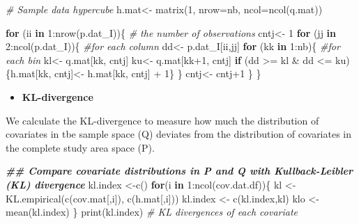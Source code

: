 \documentclass[
]{book}
\newenvironment{Shaded}{\begin{snugshade}}{\end{snugshade}}
\newcommand{\AttributeTok}[1]{\textcolor[rgb]{0.77,0.63,0.00}{#1}}
\newcommand{\CommentTok}[1]{\textcolor[rgb]{0.56,0.35,0.01}{\textit{#1}}}
\newcommand{\ControlFlowTok}[1]{\textcolor[rgb]{0.13,0.29,0.53}{\textbf{#1}}}
\newcommand{\DecValTok}[1]{\textcolor[rgb]{0.00,0.00,0.81}{#1}}
\newcommand{\DocumentationTok}[1]{\textcolor[rgb]{0.56,0.35,0.01}{\textbf{\textit{#1}}}}
\newcommand{\FunctionTok}[1]{\textcolor[rgb]{0.00,0.00,0.00}{#1}}
\newcommand{\NormalTok}[1]{#1}
\newcommand{\OtherTok}[1]{\textcolor[rgb]{0.56,0.35,0.01}{#1}}
\newcommand{\SpecialCharTok}[1]{\textcolor[rgb]{0.00,0.00,0.00}{#1}}
\providecommand{\tightlist}{%
  \setlength{\itemsep}{0pt}\setlength{\parskip}{0pt}}
\begin{document}
\begin{Shaded}
\begin{Highlighting}[]
\CommentTok{\# Sample data hypercube}
\NormalTok{  h.mat}\OtherTok{\textless{}{-}} \FunctionTok{matrix}\NormalTok{(}\DecValTok{1}\NormalTok{, }\AttributeTok{nrow=}\NormalTok{nb, }\AttributeTok{ncol=}\FunctionTok{ncol}\NormalTok{(q.mat))}
  
  \ControlFlowTok{for}\NormalTok{ (ii }\ControlFlowTok{in} \DecValTok{1}\SpecialCharTok{:}\FunctionTok{nrow}\NormalTok{(p.dat\_I))\{ }\CommentTok{\# the number of observations}
\NormalTok{    cntj}\OtherTok{\textless{}{-}} \DecValTok{1} 
    \ControlFlowTok{for}\NormalTok{ (jj }\ControlFlowTok{in} \DecValTok{2}\SpecialCharTok{:}\FunctionTok{ncol}\NormalTok{(p.dat\_I))\{ }\CommentTok{\#for each column}
\NormalTok{      dd}\OtherTok{\textless{}{-}}\NormalTok{ p.dat\_I[ii,jj]  }
      \ControlFlowTok{for}\NormalTok{ (kk }\ControlFlowTok{in} \DecValTok{1}\SpecialCharTok{:}\NormalTok{nb)\{  }\CommentTok{\#for each bin}
\NormalTok{        kl}\OtherTok{\textless{}{-}}\NormalTok{ q.mat[kk, cntj] }
\NormalTok{        ku}\OtherTok{\textless{}{-}}\NormalTok{ q.mat[kk}\SpecialCharTok{+}\DecValTok{1}\NormalTok{, cntj] }
        \ControlFlowTok{if}\NormalTok{ (dd }\SpecialCharTok{\textgreater{}=}\NormalTok{ kl }\SpecialCharTok{\&}\NormalTok{ dd }\SpecialCharTok{\textless{}=}\NormalTok{ ku)\{h.mat[kk, cntj]}\OtherTok{\textless{}{-}}\NormalTok{ h.mat[kk, cntj] }\SpecialCharTok{+} \DecValTok{1}\NormalTok{\}}
\NormalTok{      \}}
\NormalTok{      cntj}\OtherTok{\textless{}{-}}\NormalTok{ cntj}\SpecialCharTok{+}\DecValTok{1}
\NormalTok{    \}}
\NormalTok{  \}}
\end{Highlighting}
\end{Shaded}

\begin{itemize}
\tightlist
\item
  \textbf{KL-divergence}
\end{itemize}

We calculate the KL-divergence to measure how much the distribution of covariates in tbe sample space (Q) deviates from the distribution of covariates in the complete study area space (P).

\begin{Shaded}
\begin{Highlighting}[]
\DocumentationTok{\#\# Compare covariate distributions in P and Q with Kullback{-}Leibler (KL) divergence}
\NormalTok{    kl.index }\OtherTok{\textless{}{-}}\FunctionTok{c}\NormalTok{()}
    \ControlFlowTok{for}\NormalTok{(i }\ControlFlowTok{in} \DecValTok{1}\SpecialCharTok{:}\FunctionTok{ncol}\NormalTok{(cov.dat.df))\{}
\NormalTok{      kl }\OtherTok{\textless{}{-}}    \FunctionTok{KL.empirical}\NormalTok{(}\FunctionTok{c}\NormalTok{(cov.mat[,i]), }\FunctionTok{c}\NormalTok{(h.mat[,i]))}
\NormalTok{      kl.index }\OtherTok{\textless{}{-}} \FunctionTok{c}\NormalTok{(kl.index,kl)}
\NormalTok{      klo }\OtherTok{\textless{}{-}}  \FunctionTok{mean}\NormalTok{(kl.index)}
\NormalTok{    \}}
    \FunctionTok{print}\NormalTok{(kl.index) }\CommentTok{\# KL divergences of each covariate}
\end{Highlighting}
\end{Shaded}
\end{document}

